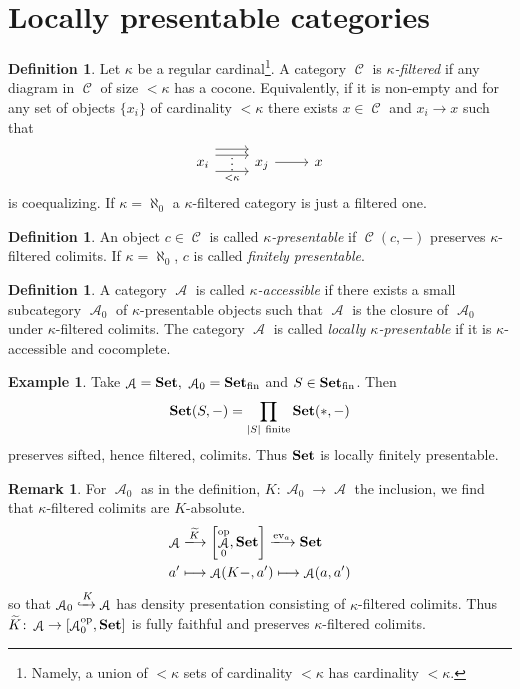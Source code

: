 \documentclass[a4paper,11pt,oneside,openany]{scrbook}
\newcommand{\catname}[1]{{\normalfont\textbf{#1}}}
\newcommand{\Set}{\catname{Set}}
\DeclareMathOperator{\op}{\text{op}}
\DeclareMathOperator{\A}{\mathcal{A}}
\DeclareMathOperator{\C}{\mathcal{C}}
\theoremstyle{definition}
\theoremstyle{definition}
\newtheorem{defn}[thm]{Definition} %
\newtheorem{rmk}[thm]{Remark}
\newtheorem{exmp}[thm]{Example}
\begin{document}
\section{Locally presentable categories}
\begin{defn}
    Let $\kappa$ be a regular cardinal\footnote{Namely, a union of $<\kappa$ sets of cardinality $<\kappa$ has cardinality $<\kappa$.}. A category $\C$ is \emph{$\kappa$-filtered} if any diagram in $\C$ of size $<\kappa$ has a cocone. Equivalently, if it is non-empty and for any set of objects $\{x_i\}$ of cardinality $<\kappa$ there exists $x\in\C$ and $x_i\to x$ such that
    \[
    \begin{tikzcd}
 x_i\arrow[r,shift left=2.2ex] \arrow[r,shift left=1.2ex,""{name=A}] \arrow[r, shift right=1.5ex,"<\kappa"',""{name=B}]\ar[from=A, to=B, phantom, "\vdots"]&x_j \arrow[r]&x 
\end{tikzcd}
    \]
is coequalizing. If $\kappa=\aleph_0$ a $\kappa$-filtered category is just a filtered one.    
\end{defn}
\begin{defn}
An object $c\in\C$ is called \emph{$\kappa$-presentable} if $\C(c,-)$ preserves $\kappa$-filtered colimits. If $\kappa=\aleph_0$, $c$ is called \emph{finitely presentable}. 
\end{defn}
\begin{defn}
A category $\A$ is called \emph{$\kappa$-accessible} if there exists a small subcategory $\A_0$ of $\kappa$-presentable objects such that $\A$ is the closure of $\A_0$ under $\kappa$-filtered colimits. The category $\A$ is called \emph{locally $\kappa$-presentable} if it is $\kappa$-accessible and cocomplete. 
\end{defn}
\begin{exmp}
Take $\A=\Set,\ \A_0=\Set_\text{fin}$ and $S\in\Set_\text{fin}$. Then $$\Set(S,-)=\displaystyle\prod_{|S| \ \text{finite}}\Set(*,-)$$
preserves sifted, hence filtered, colimits. Thus $\Set$ is locally finitely presentable.
\end{exmp}
\begin{rmk}
    For $\A_0$ as in the definition, $K\colon\A_0\to\A$ the inclusion, we find that $\kappa$-filtered colimits are $K$-absolute.
    \begin{align*}
    \A&\xlongrightarrow{\widetilde{K}}\left[\A_0^{\op},\Set\right]\xlongrightarrow{\text{ev}_a}\Set\\
    a'&\longmapsto\A(K-,a')\longmapsto\A(a,a')
    \end{align*}
so that $\A_0\xhookrightarrow{K}\A$ has density presentation consisting of $\kappa$-filtered colimits. Thus $\widetilde{K}\colon\A\to\left[\A_0^{\op},\Set\right]$ is fully faithful and preserves $\kappa$-filtered colimits.
\end{rmk}
\end{document}
